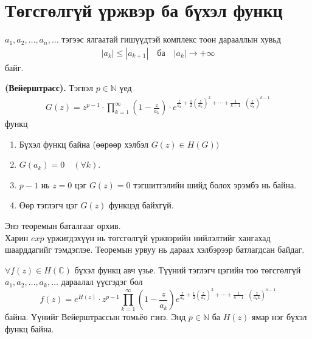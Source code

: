 \section{Төгсгөлгүй үржвэр ба бүхэл функц}
$a_1,a_2,\ldots ,a_n,\ldots$ тэгээс ялгаатай гишүүдтэй комплекс тоон дарааллын хувьд 
\begin{eqnarray} \label{8.5}
 |a_k|\leq |a_{k+1}| \quad \text{ба} \quad |a_k|\rightarrow +\infty
\end{eqnarray} байг. 
\begin{thm}
\textbf{(Вейерштрасс).}  Тэгвэл $p\in\mathbb{N}$ үед
\begin{eqnarray} \label{8.6}
 G(z)=z^{p-1}\cdot \prod\limits_{k=1}^\infty \left(1-\frac{z}{a_k}\right)\cdot e^{\frac{z}{a_k}+\frac{1}{2}\left(\frac{z}{a_k}\right)^2+\cdots +\frac{1}{k-1}\cdot \left(\frac{z}{a_k}\right)^{k-1}}
\end{eqnarray}
функц
\begin{enumerate}
    \item [a)] Бүхэл функц байна (өөрөөр хэлбэл $G(z)\in H(G))$
      \item [б)] $G(a_k)=0 \quad (\forall k).$
     \item [в)] $p-1$ нь $z=0$ цэг $G(z)=0$ тэгшитгэлийн шийд болох эрэмбэ нь байна.
     \item [г)] Өөр тэглэгч цэг $G(z)$ функцэд байхгүй.
\end{enumerate}
\end{thm}
Энэ теоремын баталгааг орхив.\\
Харин $exp$ үржигдэхүүн нь төгсгөлгүй үржвэрийн нийлэлтийг хангахад шаарддагийг тэмдэглэе. Теоремын урвуу нь дараах хэлбэрээр батлагдсан байдаг.
\begin{thm}
$\forall f(z)\in H(\mathbb{C})$ бүхэл функц авч үзье. Түүний тэглэгч цэгийн тоо төгсгөлгүй $a_1,a_2, \ldots, a_k,\ldots$  дараалал үүсгэдэг бол
$$f(z)=e^{H(z)}\cdot z^{p-1}\prod\limits_{k=1}^\infty \left(1-\frac{z}{a_k}\right) e^{\frac{z}{a_k}+\frac{1}{2}\left(\frac{z}{a_k}\right)^2+\cdots +\frac{1}{n-1}\cdot \left(\frac{z}{a_kk}\right)^{n-1}} $$ байна. Үүнийг Вейерштрассын томьёо  гэнэ. Энд $p\in\mathbb{N}$ ба $H(z)$ ямар нэг бүхэл функц байна. 
\end{thm}
